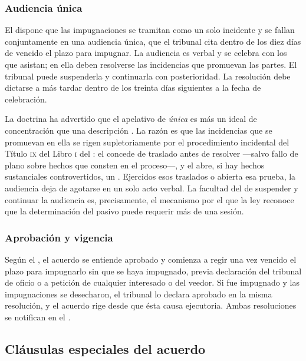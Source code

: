 \subsubsection{Audiencia única}

El  dispone que las impugnaciones se tramitan como un solo incidente y se fallan
conjuntamente en una audiencia única, que el tribunal cita dentro de los diez días de
vencido el plazo para impugnar. La audiencia es verbal y se celebra con los que asistan; en
ella deben resolverse las incidencias que promuevan las partes. El tribunal puede
suspenderla y continuarla con posterioridad. La resolución debe dictarse a más tardar dentro
de los treinta días siguientes a la fecha de celebración.

\begin{alerta}
La doctrina ha advertido que el apelativo de \emph{única} es más un ideal de concentración que una
descripción \parencite{ruz-derecho-concursal}. La razón es que las incidencias que se promuevan en
ella se rigen supletoriamente por el procedimiento incidental del Título \textsc{ix} del Libro
\textsc{i} del \cpc{}: el  concede  de traslado antes de resolver
---salvo fallo de plano sobre hechos que consten en el proceso---, y el  abre, si hay
hechos sustanciales controvertidos, un . Ejercidos esos
traslados o abierta esa prueba, la audiencia deja de agotarse en un solo acto verbal. La facultad
del  de suspender y continuar la audiencia es, precisamente, el mecanismo por el que la ley
reconoce que la determinación del pasivo puede requerir más de una sesión.
\end{alerta}

\subsubsection{Aprobación y vigencia}

Según el , el acuerdo se entiende aprobado y comienza a regir una vez vencido el
plazo para impugnarlo sin que se haya impugnado, previa declaración del tribunal de oficio o
a petición de cualquier interesado o del veedor. Si fue impugnado y las impugnaciones se
desecharon, el tribunal lo declara aprobado en la misma resolución, y el acuerdo rige desde
que ésta causa ejecutoria. Ambas resoluciones se notifican en el \boletin{}.

\subsection{Cláusulas especiales del acuerdo}

